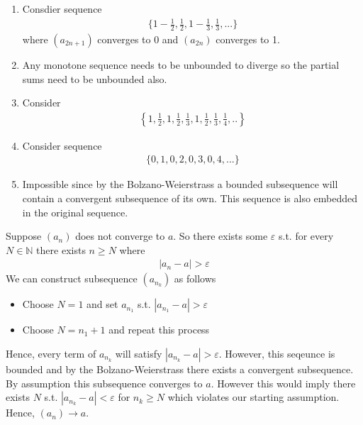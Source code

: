\begin{enumerate}[label=(\alph*)]
    \item 
    Consdier sequence
    \begin{align*}
        \{1-\frac{1}{2}, \frac{1}{2}, 1-\frac{1}{3}, \frac{1}{3}, ...\}
    \end{align*}
    where $(a_{2n+1})$ converges to 0 and $(a_{2n})$ converges to 
    1.

    \item 
    Any monotone sequence needs to be unbounded to diverge so
    the partial sums need to be unbounded also.

    \item 
    Consider
    \begin{align*}
        \left\{1, \frac{1}{2}, 1, \frac{1}{2}, \frac{1}{3}, 1, \frac{1}{2}, \frac{1}{3}, \frac{1}{4},..\right\}
    \end{align*}

    \item
    Consider sequence
    \begin{align*}
        \{0,1,0,2,0,3,0,4,...\}
    \end{align*}

    \item
    Impossible since by the Bolzano-Weierstrass \Thm a bounded 
    subsequence will 
    contain a convergent subsequence of its own. This sequence is also embedded
    in the original sequence.
\end{enumerate}

Suppose $(a_n)$ does not converge to $a$. So there exists 
 some $\varepsilon$ s.t. for every $N\in \mathbb{N}$ there exists $n \geq N$ where
\begin{align*}
    |a_n - a| > \varepsilon
\end{align*}
We can construct subsequence $(a_{n_k})$ as follows
\begin{itemize}
    \item Choose $N = 1$ and set $a_{n_1}$ s.t. $|a_{n_1} - a| > \varepsilon$ 
    \item Choose $N = n_1 + 1$ and repeat this process
\end{itemize} 
Hence, every term of $a_{n_k}$ will satisfy $|a_{n_k} - a| > \varepsilon$.
However, this seqeunce is bounded and by the Bolzano-Weierstrass \Thm there 
exists a convergent subsequence. By assumption this subsequence 
 converges to $a$. However this would imply there exists $N$ s.t. 
 $|a_{n_k} - a| < \varepsilon$ for $n_k\geq N$ which violates our starting
 assumption. Hence, $(a_n)\rightarrow a$.



